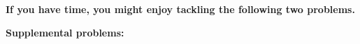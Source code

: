 \documentclass[handout]{mcs}
\begin{document}


\inhandout{\instatements{\newpage}}


\inhandout{\instatements{\newpage}}
\begin{center}
\textbf{
If you have time, you might enjoy tackling the following two
problems.
}
\end{center}

\textbf{Supplemental problems:}


\end{document}
